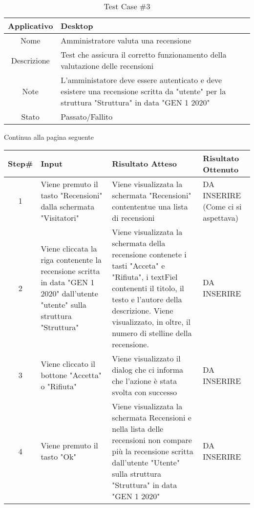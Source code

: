\pagebreak
\begin{table}[H]
    \centering
    \footnotesize
    \caption{Test Case \#3}
    \begin{tabularx}{\textwidth}{|c|X|}
        \hline
        Applicativo & Desktop\\
        \hline
        Nome & Amministratore valuta una recensione  \\
        \hline
        Descrizione & Test che assicura il corretto funzionamento della valutazione delle recensioni\\
        \hline
        Note & L'amministatore deve essere autenticato e deve esistere una recensione scritta da "utente" per la struttura "Struttura" in data "GEN 1 2020" \\
        \hline
        Stato & Passato/Fallito\\
        \hline

    \end{tabularx}
    Continua alla pagina seguente
    \setlength{\tabcolsep}{8pt}
    \renewcommand{\arraystretch}{1.5}
\end{table}

\begin{table}[H]
    \footnotesize
    \begin{tabularx}{\textwidth}{|c|X|X|X|}
        \hline
        Step\# & Input & Risultato Atteso & Risultato Ottenuto \\
        \hline
         1 & Viene premuto il tasto "Recensioni" dalla schermata "Visitatori" 
         & Viene visualizzata la schermata "Recensioni" contententue una lista di recensioni
         &DA INSERIRE (Come ci si aspettava)\\
          \hline
        2 & Viene cliccata la riga contenente la recensione scritta in data "GEN 1 2020" dall'utente "utente" sulla struttura "Struttura"
        & Viene visualizzata la schermata della recensione contenete i tasti "Acceta" e  "Rifiuta", i textFiel contenenti il titolo, il testo e l'autore della descrizione.
        Viene visualizzato, in oltre, il numero di stelline della recensione.
        & DA INSERIRE\\
         \hline 
        3 & Viene cliccato il bottone "Accetta" o "Rifiuta"
         & Viene visualizzato il dialog che ci informa che l'azione è stata svolta con successo
         & DA INSERIRE\\
          \hline
          4 & Viene premuto il tasto "Ok"
         & Viene visualizzata la schermata Recensioni e nella lista delle recensioni non compare più 
         la recensione scritta dall'utente "Utente" sulla struttura "Struttura" in data "GEN 1 2020"
         & DA INSERIRE\\
          \hline      
    \end{tabularx}
\end{table}
    
       
